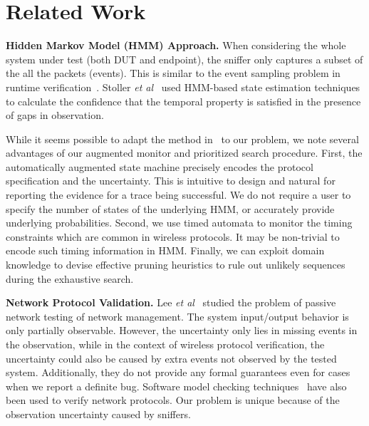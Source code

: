 \section{Related Work}
\label{sec:related}

\textbf{Hidden Markov Model (HMM) Approach.} When considering the whole system
under test (both DUT and endpoint), the sniffer only captures a subset of the
all the packets (events).  This is similar to the event sampling problem in
runtime
verification~\cite{bonakdarpour2011sampling,hauswirth2004low,arnold2008qvm,fei2006artemis,basin2012monitoring}.
Stoller \textit{et al}~\cite{stoller2011runtime} used HMM-based state estimation
techniques to calculate the confidence that the temporal property is satisfied
in the presence of gaps in observation.

While it seems possible to adapt the
method in~\cite{stoller2011runtime} to our problem, we note several advantages
of our augmented monitor and prioritized search procedure. First, the
automatically augmented state machine precisely encodes the protocol
specification and the uncertainty. This is intuitive to design and natural for
reporting the evidence for a trace being successful. We do not require a user
to specify the number of states of the underlying HMM, or accurately provide
underlying probabilities. Second, we use timed automata to monitor the timing
constraints which are common in wireless protocols. It may be non-trivial to
encode such timing information in HMM. Finally, we can exploit domain knowledge
to devise effective pruning heuristics to rule out unlikely sequences during the
exhaustive search. 

\textbf{Network Protocol Validation.} Lee \textit{et al}~\cite{lee1997passive}
studied the problem of passive network testing of network management. The system
input/output behavior is only partially observable. However, the uncertainty
only lies in missing events in the observation, while in the context of wireless
protocol verification, the uncertainty could also be caused by extra events not
observed by the tested system. Additionally, they do not provide any formal
guarantees even for cases when we report a definite bug.  Software model
checking techniques~\cite{musuvathi2002cmc,godefroid1997model} have also been
used to verify network protocols. Our problem is unique because of the
observation uncertainty caused by sniffers.

